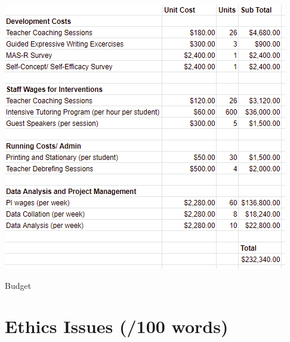 \documentclass[14pt]{memoir}
\begin{document}
\begin{table}[p]
\begin{center}
\includegraphics[scale=1.2]{Budget.PNG}
\end{center}
\caption{Budget \label{tab:budget}}
\end{table}



\section{Ethics Issues (/100 words)}
\end{document}
